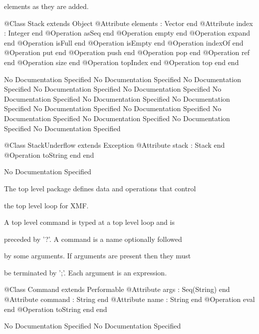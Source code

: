       elements as they are added.
\begin{Interface}
@Class Stack extends Object
  @Attribute elements : Vector end
  @Attribute index : Integer end
  @Operation asSeq end
  @Operation empty end
  @Operation expand end
  @Operation isFull end
  @Operation isEmpty end
  @Operation indexOf end
  @Operation put end
  @Operation push end
  @Operation pop end
  @Operation ref end
  @Operation size end
  @Operation topIndex end
  @Operation top end
end
\end{Interface}
No Documentation Specified
No Documentation Specified
No Documentation Specified
No Documentation Specified
No Documentation Specified
No Documentation Specified
No Documentation Specified
No Documentation Specified
No Documentation Specified
No Documentation Specified
No Documentation Specified
No Documentation Specified
No Documentation Specified
No Documentation Specified
\begin{Interface}
@Class StackUnderflow extends Exception
  @Attribute stack : Stack end
  @Operation toString end
end
\end{Interface}
No Documentation Specified

      The top level package defines data and operations that control

      the top level loop for XMF.

      A top level command is typed at a top level loop and is

      preceded by '?'. A command is a name optionally followed

      by some arguments. If arguments are present then they must

      be terminated by ';'. Each argument is an expression.
\begin{Interface}
@Class Command extends Performable
  @Attribute args : Seq(String) end
  @Attribute command : String end
  @Attribute name : String end
  @Operation eval end
  @Operation toString end
end
\end{Interface}
No Documentation Specified
No Documentation Specified

